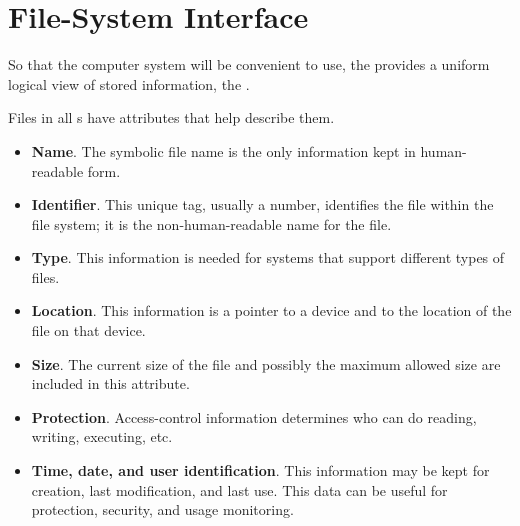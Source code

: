 \section{File-System Interface}\label{sec:FS_Interface}
So that the computer system will be convenient to use, the  provides a uniform logical view of stored information, the .


Files in all s have attributes that help describe them.
\begin{itemize}[noitemsep]
\item \textbf{Name}.
  The symbolic file name is the only information kept in human-readable form.
\item \textbf{Identifier}.
  This unique tag, usually a number, identifies the file within the file system; it is the non-human-readable name for the file.
\item \textbf{Type}.
  This information is needed for systems that support different types of files.
\item \textbf{Location}.
  This information is a pointer to a device and to the location of the file on that device.
\item \textbf{Size}.
  The current size of the file and possibly the maximum allowed size are included in this attribute.
\item \textbf{Protection}.
  Access-control information determines who can do reading, writing, executing, etc.
\item \textbf{Time, date, and user identification}.
  This information may be kept for creation, last modification, and last use.
  This data can be useful for protection, security, and usage monitoring.
\end{itemize}


